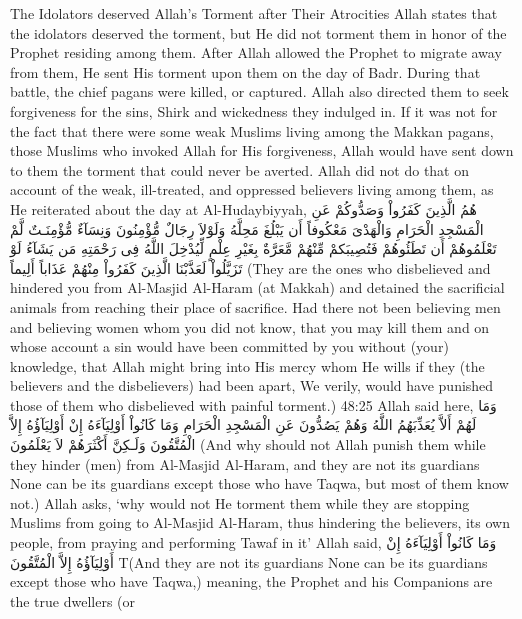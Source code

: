 \documentclass[11pt,a4paper,openany]{book}
\let\textAR\textarabic
\begin{document}
\begin{tafsirbox}
The Idolators deserved Allah's Torment after Their Atrocities Allah states that the idolators deserved the torment, but He did not torment them in honor of the Prophet residing among them. After Allah allowed the Prophet to migrate away from them, He sent His torment upon them on the day of Badr. During that battle, the chief pagans were killed, or captured. Allah also directed them to seek forgiveness for the sins, Shirk and wickedness they indulged in. If it was not for the fact that there were some weak Muslims living among the Makkan pagans, those Muslims who invoked Allah for His forgiveness, Allah would have sent down to them the torment that could never be averted. Allah did not do that on account of the weak, ill-treated, and oppressed believers living among them, as He reiterated about the day at Al-Hudaybiyyah, \textAR{هُمُ} \textAR{الَّذِينَ} \textAR{كَفَرُواْ} \textAR{وَصَدُّوكُمْ} \textAR{عَنِ} \textAR{الْمَسْجِدِ} \textAR{الْحَرَامِ} \textAR{وَالْهَدْىَ} \textAR{مَعْكُوفاً} \textAR{أَن} \textAR{يَبْلُغَ} \textAR{مَحِلَّهُ} \textAR{وَلَوْلاَ} \textAR{رِجَالٌ} \textAR{مُّؤْمِنُونَ} \textAR{وَنِسَآءٌ} \textAR{مُّؤْمِنَـتٌ} \textAR{لَّمْ} \textAR{تَعْلَمُوهُمْ} \textAR{أَن} \textAR{تَطَئُوهُمْ} \textAR{فَتُصِيبَكمْ} \textAR{مِّنْهُمْ} \textAR{مَّعَرَّةٌ} \textAR{بِغَيْرِ} \textAR{عِلْمٍ} \textAR{لِّيُدْخِلَ} \textAR{اللَّهُ} \textAR{فِى} \textAR{رَحْمَتِهِ} \textAR{مَن} \textAR{يَشَآءُ} \textAR{لَوْ} \textAR{تَزَيَّلُواْ} \textAR{لَعَذَّبْنَا} \textAR{الَّذِينَ} \textAR{كَفَرُواْ} \textAR{مِنْهُمْ} \textAR{عَذَاباً} \textAR{أَلِيماً} (They are the ones who disbelieved and hindered you from Al-Masjid Al-Haram (at Makkah) and detained the sacrificial animals from reaching their place of sacrifice. Had there not been believing men and believing women whom you did not know, that you may kill them and on whose account a sin would have been committed by you without (your) knowledge, that Allah might bring into His mercy whom He wills if they (the believers and the disbelievers) had been apart, We verily, would have punished those of them who disbelieved with painful torment.) 48:25 Allah said here, \textAR{وَمَا} \textAR{لَهُمْ} \textAR{أَلاَّ} \textAR{يُعَذِّبَهُمُ} \textAR{اللَّهُ} \textAR{وَهُمْ} \textAR{يَصُدُّونَ} \textAR{عَنِ} \textAR{الْمَسْجِدِ} \textAR{الْحَرَامِ} \textAR{وَمَا} \textAR{كَانُواْ} \textAR{أَوْلِيَآءَهُ} \textAR{إِنْ} \textAR{أَوْلِيَآؤُهُ} \textAR{إِلاَّ} \textAR{الْمُتَّقُونَ} \textAR{وَلَـكِنَّ} \textAR{أَكْثَرَهُمْ} \textAR{لاَ} \textAR{يَعْلَمُونَ} (And why should not Allah punish them while they hinder (men) from Al-Masjid Al-Haram, and they are not its guardians None can be its guardians except those who have Taqwa, but most of them know not.) Allah asks, `why would not He torment them while they are stopping Muslims from going to Al-Masjid Al-Haram, thus hindering the believers, its own people, from praying and performing Tawaf in it' Allah said, \textAR{وَمَا} \textAR{كَانُواْ} \textAR{أَوْلِيَآءَهُ} \textAR{إِنْ} \textAR{أَوْلِيَآؤُهُ} \textAR{إِلاَّ} \textAR{الْمُتَّقُونَ} T(And they are not its guardians None can be its guardians except those who have Taqwa,) meaning, the Prophet and his Companions are the true dwellers (or 
\end{tafsirbox}
\end{document}
